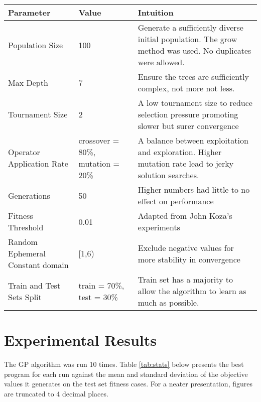 \documentclass[a4paper,12pt]{article}
\begin{document}
\begin{tabularx}{\textwidth} {
        | X | X | X | }

    \hline
    \textbf{Parameter}               & \textbf{Value}                    & \textbf{Intuition}                                                                                        \\
    \hline
    Population Size                  & 100                               & Generate a sufficiently diverse initial population. The grow method was used. No duplicates were allowed. \\
    \hline
    Max Depth                        & 7                                 & Ensure the trees are sufficiently complex, not more not less.                                             \\
    \hline
    Tournament Size                  & 2                                 & A low tournament size to reduce selection pressure promoting slower but surer convergence                 \\
    \hline
    Operator Application Rate        & crossover = 80\%, mutation = 20\% & A balance between exploitation and exploration. Higher mutation rate lead to jerky solution searches.     \\
    \hline
    Generations                      & 50                                & Higher numbers had little to no effect on performance                                                     \\
    \hline
    Fitness Threshold                & 0.01                              & Adapted from John Koza's experiments                                                                      \\
    \hline
    Random Ephemeral Constant domain & [1,6)                             & Exclude negative values for more stability in convergence                                                 \\
    \hline
    Train and Test Sets Split        & train = 70\%, test = 30\%         & Train set has a majority to allow the algorithm to learn as much as possible.                             \\
    \hline
\end{tabularx}
\label{tab:params}
\section{Experimental Results}
The GP algorithm was run 10 times. Table \ref{tab:stats} below presents the best program for each run against the mean and standard deviation of the objective values it generates on the test set fitness cases. For a neater presentation, figures are truncated to 4 decimal places.
\end{document}
